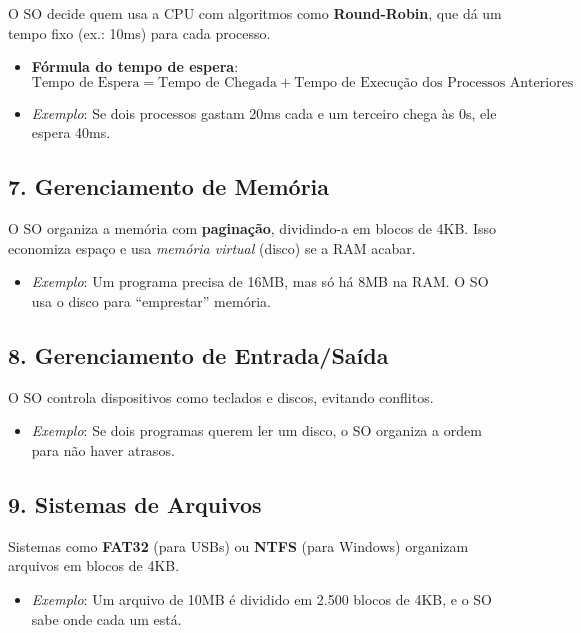 \documentclass[a4paper,12pt]{article}
\begin{document}
O SO decide quem usa a CPU com algoritmos como \textbf{Round-Robin}, que dá um tempo fixo (ex.: 10ms) para cada processo.

\begin{itemize}
    \item \textbf{Fórmula do tempo de espera}:
    \[
    \text{Tempo de Espera} = \text{Tempo de Chegada} + \text{Tempo de Execução dos Processos Anteriores}
    \]
    
    \item[] \textit{Exemplo}: Se dois processos gastam 20ms cada e um terceiro chega às 0s, ele espera 40ms.
\end{itemize}

\subsection*{7. Gerenciamento de Memória}

O SO organiza a memória com \textbf{paginação}, dividindo-a em blocos de 4KB. Isso economiza espaço e usa \textit{memória virtual} (disco) se a RAM acabar.

\begin{itemize}
    \item \textit{Exemplo}: Um programa precisa de 16MB, mas só há 8MB na RAM. O SO usa o disco para ``emprestar'' memória.
\end{itemize}

\subsection*{8. Gerenciamento de Entrada/Saída}

O SO controla dispositivos como teclados e discos, evitando conflitos.

\begin{itemize}
    \item \textit{Exemplo}: Se dois programas querem ler um disco, o SO organiza a ordem para não haver atrasos.
\end{itemize}

\subsection*{9. Sistemas de Arquivos}

Sistemas como \textbf{FAT32} (para USBs) ou \textbf{NTFS} (para Windows) organizam arquivos em blocos de 4KB.

\begin{itemize}
    \item \textit{Exemplo}: Um arquivo de 10MB é dividido em 2.500 blocos de 4KB, e o SO sabe onde cada um está.
\end{itemize}
\end{document}
